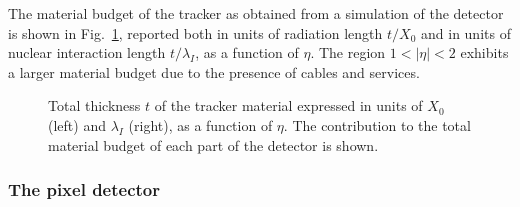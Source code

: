 The material budget of the tracker as obtained from a simulation of the detector is shown in Fig.~\ref{fig:material_budget}, reported both in units of radiation length $t/X_0$ and in units of nuclear interaction length $t/\lambda_I$, as a function of $\eta$. The region $1 < |\eta| < 2$ exhibits a larger material budget due to the presence of cables and services.
\begin{figure}[htb]
\centering
{}
\caption{Total thickness $t$ of the tracker material expressed in units of $X_0$ (left) and $\lambda_I$ (right), as a function of $\eta$. The contribution to the total material budget of each part of the detector is shown.}\label{fig:material_budget}
\end{figure}

\subsubsection{The pixel detector}

